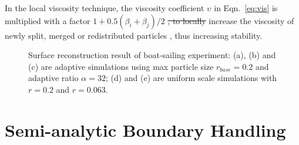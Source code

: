 \documentclass[VANCOUVER,STIX1COL]{WileyNJD-v2}
\providecommand{\DIFadd}[1]{{\protect\color{blue}\uwave{#1}}} %
\providecommand{\DIFdel}[1]{{\protect\color{red}\sout{#1}}}                      %
\providecommand{\DIFaddbegin}{} %
\providecommand{\DIFaddend}{} %
\providecommand{\DIFdelbegin}{} %
\providecommand{\DIFdelend}{} %
\providecommand{\DIFaddFL}[1]{\DIFadd{#1}} %
\providecommand{\DIFaddbeginFL}{} %
\providecommand{\DIFaddendFL}{} %
\providecommand{\DIFdelbeginFL}{} %
\providecommand{\DIFdelendFL}{} %
\begin{document}
In the local viscosity technique, the viscosity coefficient $\upsilon$ in Eqn.~\ref{eq:vis} is multiplied with a factor $1 + 0.5(\beta_i + \beta_j)/2$ \DIFdelbegin \DIFdel{, to locally }\DIFdelend \DIFaddbegin \DIFadd{to }\DIFaddend increase the viscosity of newly split, merged or redistributed particles \DIFaddbegin \DIFadd{locally}\DIFaddend , thus increasing stability.

\begin{figure}
    \centering
    \DIFdelbeginFL %
\DIFdelendFL \DIFaddbeginFL {}
    \DIFaddendFL \caption{Surface reconstruction result of \DIFaddbeginFL \DIFaddFL{the }\DIFaddendFL boat-sailing experiment: (a), (b) and (c) are adaptive simulations using max particle size $r_{base} = 0.2$ and adaptive ratio $\alpha = 32$; (d) and (e) are uniform scale simulations with $r = 0.2$ and $r = 0.063$.}
    \label{fig:ship_reconstruct}
\end{figure}


\section{Semi-analytic Boundary Handling}
\label{sec:boundary}
\end{document}
